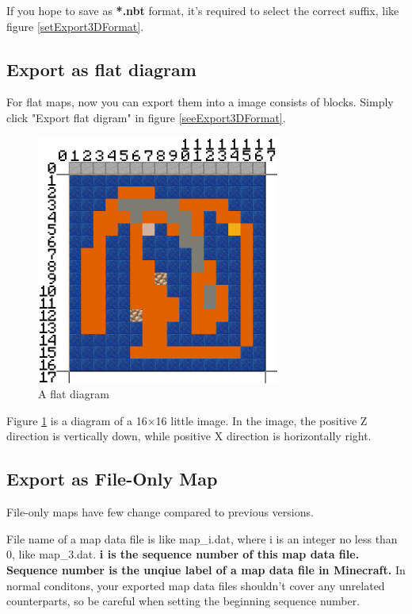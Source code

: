 \documentclass{article}
\begin{document}
If you hope to save as \textbf{*.nbt} format, it's required to select the correct suffix, like figure \ref*{setExport3DFormat}.

\subsection{Export as flat diagram}
For flat maps, now you can export them into a image consists of blocks. Simply click "Export flat digram" in figure \ref*{seeExport3DFormat}.

\begin{figure}[htbp]
    \centering
    \includegraphics[width=8cm]{Img14_FlatDiagram.png}
    \caption{A flat diagram}
    \label{flatDiagram}
\end{figure}

Figure \ref*{flatDiagram} is a diagram of a 16$\times$16 little image. In the image, the positive Z direction is vertically down, while positive X direction is horizontally right.

\subsection{Export as File-Only Map}
File-only maps have few change compared to previous versions.

File name of a map data file is like map\_i.dat, where i is an integer no less than 0, like map\_3.dat. \textbf{i is the sequence number of this map data file. Sequence number is the unqiue label of a map data file in Minecraft.} In normal conditons, your exported map data files shouldn't cover any unrelated counterparts, so be careful when setting the beginning sequence number.
\end{document}
